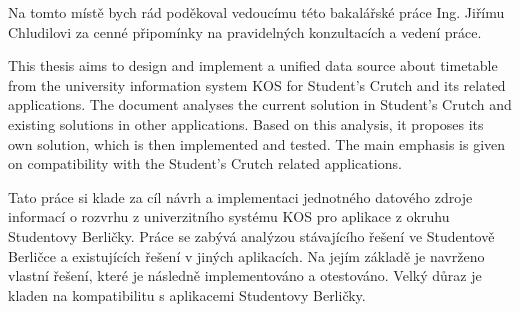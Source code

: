 \documentclass[11pt,twoside,a4paper]{book}
\begin{document}

\coverpagestarts


\acknowledgements
\noindent
Na tomto místě bych rád poděkoval vedoucímu této bakalářské práce Ing. Jiřímu Chludilovi za cenné připomínky na pravidelných konzultacích a vedení práce.





 
\abstractpage

This thesis aims to design and implement a unified data source about timetable from the university information system KOS for Student's Crutch and its related applications. The document analyses the current solution in Student's Crutch and existing solutions in other applications. Based on this analysis, it proposes its own solution, which is then implemented and tested. The main emphasis is given on compatibility with the Student's Crutch related applications.


\baselineskip

\noindent
Tato práce si klade za cíl návrh a implementaci jednotného datového zdroje informací o rozvrhu z univerzitního systému KOS pro aplikace z okruhu Studentovy Berličky. Práce se zabývá analýzou stávajícího řešení ve Studentově Berličce a existujících řešení v jiných aplikacích. Na jejím základě je navrženo vlastní řešení, které je následně implementováno a otestováno. Velký důraz je kladen na kompatibilitu s aplikacemi Studentovy Berličky.


\tableofcontents



\listoffigures



\listoftables


\end{document}
